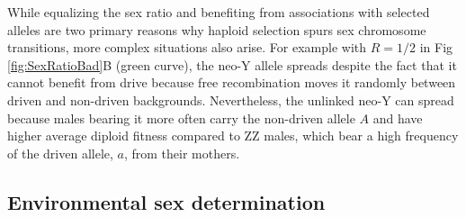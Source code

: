 \documentclass[10pt,letterpaper]{article}
\providecommand{\DIFdelbegin}{} %
\providecommand{\DIFdelend}{} %
\begin{document}
\DIFdelbegin %

\DIFdelend While equalizing the sex ratio and benefiting from associations with selected alleles are two primary reasons why haploid selection spurs sex chromosome transitions, more complex situations also arise.  
For example with $R=1/2$ in Fig \ref{fig:SexRatioBad}B (green curve), the neo-Y allele spreads despite the fact that it cannot benefit from drive because free recombination moves it randomly between driven and non-driven backgrounds.  
Nevertheless, the unlinked neo-Y can spread because males bearing it more often carry the non-driven allele $A$ and have higher average diploid fitness compared to ZZ males, which bear a high frequency of the driven allele, $a$, from their mothers.

\subsection*{Environmental sex determination}
\end{document}
